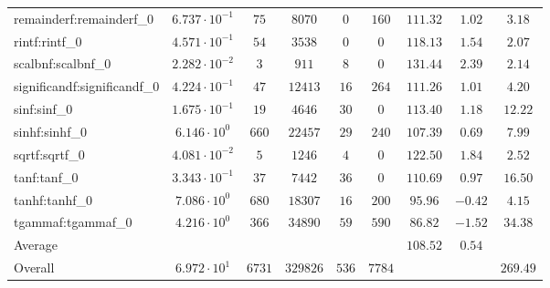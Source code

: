 \begin{tabular}{|l|c|c|c|c|c|c|c|c|}
remainderf:remainderf\_0     & $ 6.737 \cdot 10^{-1} $ & $ 75     $ & $ 8070   $ & $ 0   $ & $ 160  $ & $ 111.32      $ & $ 1.02    $ & $ 3.18    $ \\
rintf:rintf\_0               & $ 4.571 \cdot 10^{-1} $ & $ 54     $ & $ 3538   $ & $ 0   $ & $ 0    $ & $ 118.13      $ & $ 1.54    $ & $ 2.07    $ \\
scalbnf:scalbnf\_0           & $ 2.282 \cdot 10^{-2} $ & $ 3      $ & $ 911    $ & $ 8   $ & $ 0    $ & $ 131.44      $ & $ 2.39    $ & $ 2.14    $ \\
significandf:significandf\_0 & $ 4.224 \cdot 10^{-1} $ & $ 47     $ & $ 12413  $ & $ 16  $ & $ 264  $ & $ 111.26      $ & $ 1.01    $ & $ 4.20    $ \\
sinf:sinf\_0                 & $ 1.675 \cdot 10^{-1} $ & $ 19     $ & $ 4646   $ & $ 30  $ & $ 0    $ & $ 113.40      $ & $ 1.18    $ & $ 12.22   $ \\
sinhf:sinhf\_0               & $ 6.146 \cdot 10^{0}  $ & $ 660    $ & $ 22457  $ & $ 29  $ & $ 240  $ & $ 107.39      $ & $ 0.69    $ & $ 7.99    $ \\
sqrtf:sqrtf\_0               & $ 4.081 \cdot 10^{-2} $ & $ 5      $ & $ 1246   $ & $ 4   $ & $ 0    $ & $ 122.50      $ & $ 1.84    $ & $ 2.52    $ \\
tanf:tanf\_0                 & $ 3.343 \cdot 10^{-1} $ & $ 37     $ & $ 7442   $ & $ 36  $ & $ 0    $ & $ 110.69      $ & $ 0.97    $ & $ 16.50   $ \\
tanhf:tanhf\_0               & $ 7.086 \cdot 10^{0}  $ & $ 680    $ & $ 18307  $ & $ 16  $ & $ 200  $ & $ 95.96       $ & $ -0.42   $ & $ 4.15    $ \\
tgammaf:tgammaf\_0           & $ 4.216 \cdot 10^{0}  $ & $ 366    $ & $ 34890  $ & $ 59  $ & $ 590  $ & $ 86.82       $ & $ -1.52   $ & $ 34.38   $ \\
\hline
Average                      & $                     $ & $        $ & $        $ & $     $ & $      $ & $ 108.52      $ & $ 0.54    $ & $         $ \\
\hline
Overall                      & $ 6.972 \cdot 10^{1}  $ & $ 6731   $ & $ 329826 $ & $ 536 $ & $ 7784 $ & $             $ & $         $ & $ 269.49  $ \\
\hline
\end{tabular}

